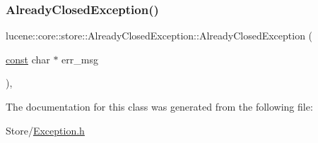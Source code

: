 \subsubsection{\texorpdfstring{Already\+Closed\+Exception()}{AlreadyClosedException()}\hspace{0.1cm}{\footnotesize\ttfamily [3/3]}}
{\footnotesize\ttfamily lucene\+::core\+::store\+::\+Already\+Closed\+Exception\+::\+Already\+Closed\+Exception (\begin{DoxyParamCaption}\item[{\mbox{\hyperlink{ZlibCrc32_8h_a2c212835823e3c54a8ab6d95c652660e}{const}} char $\ast$}]{err\+\_\+msg }\end{DoxyParamCaption})\hspace{0.3cm}{\ttfamily [inline]}, {\ttfamily [explicit]}}



The documentation for this class was generated from the following file\+:\begin{DoxyCompactItemize}
\item 
Store/\mbox{\hyperlink{Store_2Exception_8h}{Exception.\+h}}\end{DoxyCompactItemize}
